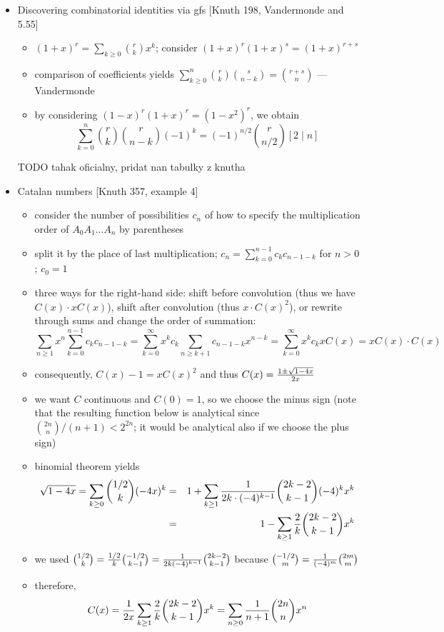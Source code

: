 \documentclass[10pt, a4paper]{article}
\begin{document}
\begin{itemize}
\item
Discovering combinatorial identities via gfs [Knuth 198, Vandermonde and 5.55]
\begin{itemize}
    \item $(1+x)^r = \sum_{k\ge 0} {r\choose k}x^k$; consider $(1+x)^r(1+x)^s = (1+x)^{r+s}$
    \item comparison of coefficients yields $\sum_{k\ge 0}^n {r\choose k}{s\choose n-k}={r+s\choose n}$ --- Vandermonde
    \item by considering $(1-x)^r(1+x)^r = (1-x^2)^r$, we obtain $$\sum_{k=0}^n {r\choose k}{r\choose n-k}(-1)^k = (-1)^{n/2}{r\choose n/2}[2\mid n]$$
\end{itemize}

TODO tahak oficialny, pridat nan tabulky z knutha

\item
Catalan numbers [Knuth 357, example 4]
\begin{itemize}
    \item consider the number of possibilities $c_n$ of how to specify the multiplication order of $A_0A_1\dots A_n$ by parentheses
    \item split it by the place of last multiplication; $c_n = \sum\limits_{k=0}^{n-1} c_kc_{n-1-k}$ for $n > 0$; $c_0=1$
    \item three ways for the right-hand side: shift before convolution (thus we have $C(x)\cdot xC(x)$),
            shift after convolution (thus $x\cdot C(x)^2$), or rewrite through sums and change the order of summation:
            $$\sum_{n\ge 1}x^n\sum_{k=0}^{n-1}c_kc_{n-1-k}=\sum_{k=0}^\infty x^kc_k\sum_{n\ge k+1} c_{n-1-k}x^{n-k}=\sum_{k=0}^\infty x^kc_k xC(x)=xC(x)\cdot C(x)$$
    \item consequently, $C(x) - 1 = xC(x)^2$ and thus $C(x) = {1\pm \sqrt{1-4x}\over 2x}$
    \item we want $C$ continuous and $C(0) = 1$, so we choose the minus sign (note that the resulting function below
            is analytical since ${2n\choose n}/(n+1) < 2^{2n}$; it would be analytical also if we choose the plus sign)
    \item binomial theorem yields
    \begin{eqnarray*}
        \sqrt{1-4x} = \sum_{k\ge 0} {1/2\choose k}(-4x)^k &=& 1+\sum_{k\ge 1}{1\over 2k\cdot (-4)^{k-1}}{2k-2\choose k-1}(-4)^kx^k\\
        &=& 1 - \sum_{k\ge 1}{2\over k}{2k-2\choose k-1}x^k 
    \end{eqnarray*}
    \item we used ${1/2\choose k}={1/2\over k}{-1/2\choose k-1} = {1\over 2k(-4)^{k-1}}{2k-2\choose k-1}$ because ${-1/2\choose m}={1\over (-4)^m}{2m\choose m}$
    \item therefore, $$C(x)={1\over 2x}\sum_{k\ge 1}{2\over k}{2k-2\choose k-1}x^k = \sum_{n\ge 0}{1\over n+1}{2n\choose n}x^n$$
\end{itemize}


\end{itemize}
\end{document}
